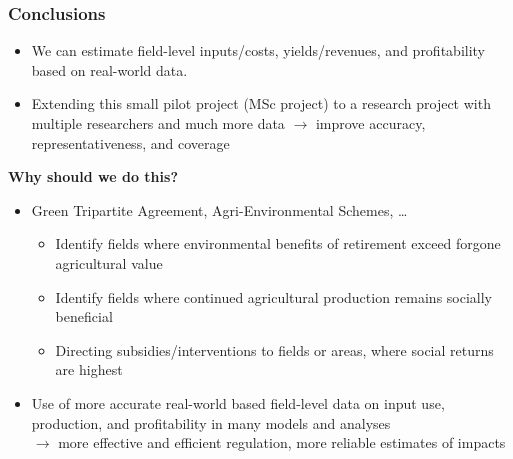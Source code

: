 \documentclass[t,24pt,aspectratio=169]{beamer}
\begin{document}
\begin{frame}[hvid]
\frametitle{\vspace{-3ex}Conclusions}
\vspace{-2ex}
\begin{itemize}
\setlength{\itemsep}{1ex}
\item We can estimate field-level inputs/costs, yields/revenues, and profitability based on real-world data.

\item Extending this small pilot project (MSc project) to a research project with multiple researchers and much more data $\rightarrow$ improve accuracy, representativeness, and coverage
\end{itemize}
\vspace{1.5ex}

\textbf{Why should we do this?}
\begin{itemize}
\setlength{\itemsep}{1ex}
\item Green Tripartite Agreement, Agri-Environmental Schemes, \ldots
\begin{itemize}
    \setlength{\itemsep}{1ex}
    \item Identify fields where environmental benefits of retirement exceed forgone agricultural value

    \item Identify fields where continued agricultural production remains socially beneficial

    \item Directing subsidies/interventions to fields or areas, where social returns are highest %
    
\end{itemize}
\item Use of more accurate real-world based field-level data on input use, production, and profitability in many models and analyses\\
$\rightarrow$ more effective and efficient regulation, more reliable estimates of impacts
\end{itemize}
\end{frame}
\end{document}
